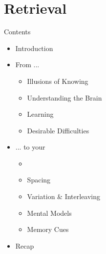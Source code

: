 \documentclass{ercisbeamer}
\begin{document}
\section{Retrieval}
\begin{frame}{Contents}
    \begin{itemize}
        \item Introduction
        \item From ...
        \begin{itemize}
            \item Illusions of Knowing
            \item Understanding the Brain
            \item Learning
            \item Desirable Difficulties
        \end{itemize}
        \item ... to your 
        \begin{itemize}
            \item {}
            \item Spacing
            \item Variation \& Interleaving
            \item Mental Models
            \item Memory Cues
        \end{itemize}
        \item Recap
    \end{itemize}
\end{frame}
\end{document}
